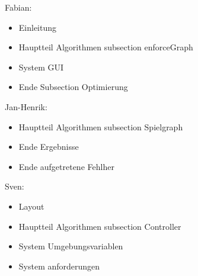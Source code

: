 Fabian:
\begin{itemize}
	\item Einleitung
	\item Hauptteil Algorithmen subsection enforceGraph
	\item System GUI 
	\item Ende Subsection Optimierung
\end{itemize}
Jan-Henrik:
\begin{itemize}
	\item Hauptteil Algorithmen subsection Spielgraph
	\item Ende Ergebnisse
	\item Ende aufgetretene Fehlher
\end{itemize}
Sven:
\begin{itemize}
	\item Layout
	\item Hauptteil Algorithmen subsection Controller
	\item System Umgebungsvariablen
	\item System anforderungen
\end{itemize}
